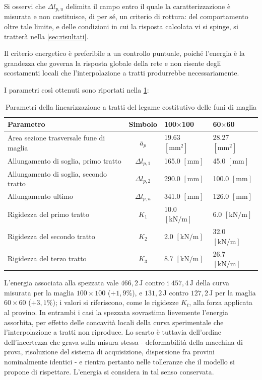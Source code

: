 Si osservi che $\Delta l_{p,u}$ delimita il campo entro il quale la caratterizzazione è misurata e non costituisce, di per sé, un criterio di rottura: del comportamento oltre tale limite, e delle condizioni in cui la risposta calcolata vi si spinge, si tratterà nella \cref{sec:risultati}.

Il criterio energetico è preferibile a un controllo puntuale, poiché l'energia è la grandezza che governa la risposta globale della rete e non risente degli scostamenti locali che l'interpolazione a tratti produrrebbe necessariamente.

I parametri così ottenuti sono riportati nella \cref{tab:linearizzazione}:
\begin{table}[htbp]
    \centering
    \caption{Parametri della linearizzazione a tratti del legame costitutivo delle funi di maglia}
    \label{tab:linearizzazione}
    \begin{tabularx}{\textwidth}{l c X X}
        \hline
        \rule{0pt}{2ex}
        \textbf{Parametro} & \textbf{Simbolo} & \textbf{100$\times$100} & \textbf{60$\times$60} \rule{0pt}{2ex} \\ \hline
        \rule{0pt}{3ex}
        Area sezione trasversale fune di maglia & $\bar{a}_p$ & 19.63 $[\text{mm}^2]$ & 28.27 $[\text{mm}^2]$ \\
        Allungamento di soglia, primo tratto & $\Delta l_{p,1}$ & 165.0 $[\text{mm}]$ & 45.0 $[\text{mm}]$ \\
        Allungamento di soglia, secondo tratto & $\Delta l_{p,2}$ & 290.0 $[\text{mm}]$ & 100.0 $[\text{mm}]$ \\
        Allungamento ultimo & $\Delta l_{p,u}$ & 341.0 $[\text{mm}]$ & 126.0 $[\text{mm}]$ \\
        Rigidezza del primo tratto & $K_{1}$ & 10.0 $[\text{kN/m}]$ & 6.0 $[\text{kN/m}]$ \\
        Rigidezza del secondo tratto & $K_{2}$ & 2.0 $[\text{kN/m}]$ & 32.0 $[\text{kN/m}]$ \\
        Rigidezza del terzo tratto & $K_{3}$ & 8.7 $[\text{kN/m}]$ & 26.7 $[\text{kN/m}]$ \\ \hline
    \end{tabularx}
\end{table}

L'energia associata alla spezzata vale $466,2 \, \text{J}$ contro i $457,4 \, \text{J}$ della curva misurata per la maglia $100\times100$ ($ +1,9\%$), e $131,2 \, \text{J}$ contro $127,2\,\text{J}$ per la maglia $60\times60$ ($ +3,1\%$); i valori si riferiscono, come le rigidezze $K_t$, alla forza applicata al provino. In entrambi i casi la spezzata sovrastima lievemente l'energia assorbita, per effetto delle concavità locali della curva sperimentale che l'interpolazione a tratti non riproduce. Lo scarto è tuttavia dell'ordine dell'incertezza che grava sulla misura stessa - deformabilità della macchina di prova, risoluzione del sistema di acquisizione, dispersione fra provini nominalmente identici - e rientra pertanto nelle tolleranze che il modello si propone di rispettare. L'energia si considera in tal senso conservata. 

